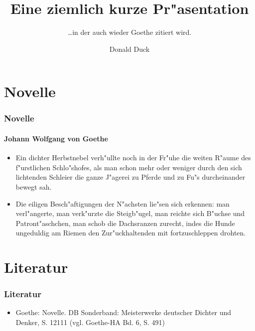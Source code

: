 \documentclass[ddcfooter]{tudbeamer}
\begin{document}

\title[Kurze Pr"asentation]{Eine ziemlich kurze Pr"asentation}
\subtitle{\ldots in der auch wieder Goethe zitiert wird.}
\author{Donald Duck}

\maketitle

\section{Novelle}
\begin{frame}
    \frametitle{Novelle}
    \framesubtitle{Johann Wolfgang von Goethe}
    \begin{itemize}
        \item Ein dichter Herbstnebel verh"ullte noch in der Fr"uhe die weiten R"aume des
              f"urstlichen Schlo"shofes, als man schon mehr oder weniger durch den sich
              lichtenden Schleier die ganze J"agerei zu Pferde und zu Fu"s durcheinander
              bewegt sah. 
        \item Die eiligen Besch"aftigungen der N"achsten lie"sen sich erkennen:
              man verl"angerte, man verk"urzte die Steigb"ugel, man reichte sich B"uchse
              und Patront"aschchen, man schob die Dachsranzen zurecht, indes die Hunde
              ungeduldig am Riemen den Zur"uckhaltenden mit fortzuschleppen drohten.
    \end{itemize}
\end{frame}

\section{Literatur}
\begin{frame}
    \frametitle*{Literatur}
    \begin{itemize}
        \item Goethe: Novelle. DB Sonderband: Meisterwerke deutscher Dichter und Denker,
              S. 12111 (vgl. Goethe-HA Bd. 6, S. 491)
    \end{itemize}
\end{frame}
\end{document}
